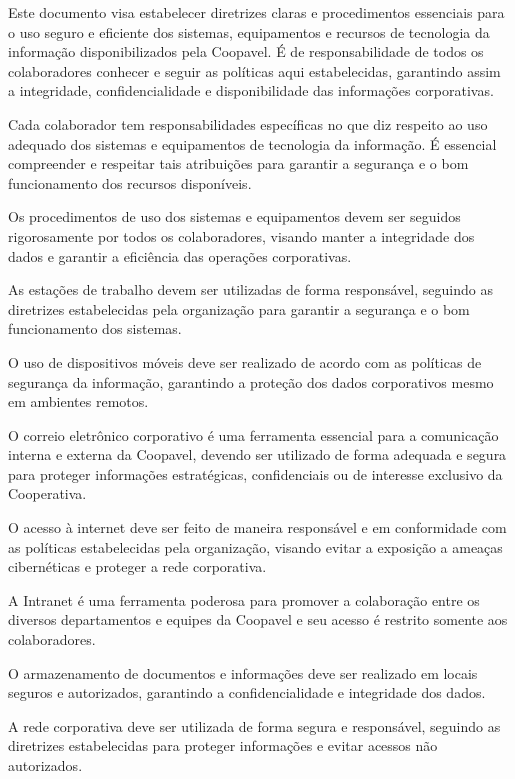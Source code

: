 \documentclass[letterpaper,10pt,portuges]{sphinxmanual}
\begin{document}
\sphinxAtStartPar
Este documento visa estabelecer diretrizes claras e procedimentos essenciais para o uso
seguro e eficiente dos sistemas, equipamentos e recursos de tecnologia da informação
disponibilizados pela Coopavel. É de responsabilidade de todos os colaboradores
conhecer e seguir as políticas aqui estabelecidas, garantindo assim a integridade,
confidencialidade e disponibilidade das informações corporativas.

\sphinxAtStartPar
Cada colaborador tem responsabilidades específicas no que diz respeito ao uso adequado
dos sistemas e equipamentos de tecnologia da informação. É essencial compreender e
respeitar tais atribuições para garantir a segurança e o bom funcionamento dos recursos
disponíveis.

\sphinxAtStartPar
Os procedimentos de uso dos sistemas e equipamentos devem ser seguidos rigorosamente
por todos os colaboradores, visando manter a integridade dos dados e garantir a eficiência
das operações corporativas.

\sphinxAtStartPar
As estações de trabalho devem ser utilizadas de forma responsável, seguindo as diretrizes
estabelecidas pela organização para garantir a segurança e o bom funcionamento dos
sistemas.

\sphinxAtStartPar
O uso de dispositivos móveis deve ser realizado de acordo com as políticas de segurança
da informação, garantindo a proteção dos dados corporativos mesmo em ambientes
remotos.

\sphinxAtStartPar
O correio eletrônico corporativo é uma ferramenta essencial para a comunicação interna
e externa da Coopavel, devendo ser utilizado de forma adequada e segura para proteger
informações estratégicas, confidenciais ou de interesse exclusivo da Cooperativa.

\sphinxAtStartPar
O acesso à internet deve ser feito de maneira responsável e em conformidade com as
políticas estabelecidas pela organização, visando evitar a exposição a ameaças
cibernéticas e proteger a rede corporativa.

\sphinxAtStartPar
A Intranet é uma ferramenta poderosa para promover a colaboração entre os diversos
departamentos e equipes da Coopavel e seu acesso é restrito somente aos colaboradores.

\sphinxAtStartPar
O armazenamento de documentos e informações deve ser realizado em locais seguros e
autorizados, garantindo a confidencialidade e integridade dos dados.

\sphinxAtStartPar
A rede corporativa deve ser utilizada de forma segura e responsável, seguindo as
diretrizes estabelecidas para proteger informações e evitar acessos não autorizados.
\end{document}
